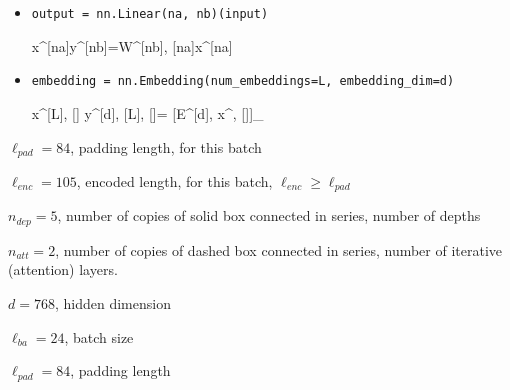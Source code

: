 \documentclass[12pt]{article}
\begin{document}
\begin{itemize}

\item {\tt output = nn.Linear(na, nb)(input)}

\beq
x^{[na]}\rarrow y^{[nb]}=W^{[nb], [na]}x^{[na]}
\eeq

\item{\tt embedding = nn.Embedding(num\_embeddings=L, embedding\_dim=d)}

\beq
x^{[L], [\ell]}\rarrow
y^{[d], [L], [\ell]}=
[E^{[d], \beta}x^{\beta, [\ell]}]_{
\beta\in[L]}
\eeq

\end{itemize}




%
%
%

$\ell_{pad}=84$, padding length, for this batch

$\ell_{enc}=105$, encoded length, for this batch, $\ell_{enc}\geq \ell_{pad}$

$n_{dep}=5$, number of copies of solid box connected in series, number of depths

 $n_{att}=2$, number of copies of
dashed box connected in series, number of iterative (attention) layers.


$d=768$, hidden dimension


$\ell_{ba}=24$, batch size

$\ell_{pad}=84$, padding length
\end{document}
